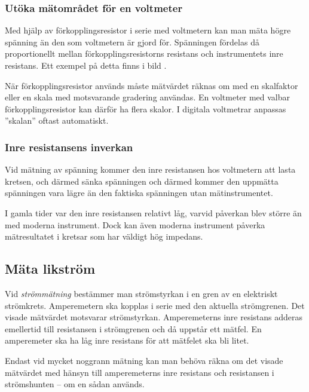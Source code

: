 \subsubsection{Utöka mätområdet för en voltmeter}

Med hjälp av förkopplingsresistor i serie med voltmetern kan man mäta
högre spänning än den som voltmetern är gjord för.
Spänningen fördelas då proportionellt mellan förkopplingsresistorns resistans
och instrumentets inre resistans.
Ett exempel på detta finns i bild .

När förkopplingsresistor används måste mätvärdet räknas om med en
skalfaktor eller en skala med motsvarande gradering användas.
En voltmeter med valbar förkopplingsresistor kan därför ha flera skalor.
I digitala voltmetrar anpassas ''skalan'' oftast automatiskt.

\newpage %
\subsubsection{Inre resistansens inverkan}

Vid mätning av spänning kommer den inre resistansen hos voltmetern att lasta
kretsen, och därmed sänka spänningen och därmed kommer den uppmätta spänningen
vara lägre än den faktiska spänningen utan mätinstrumentet.

I gamla tider var den inre resistansen relativt låg, varvid påverkan blev större
än med moderna instrument.
Dock kan även moderna instrument påverka mätresultatet i kretsar som har väldigt
hög impedans.

\subsection{Mäta likström}

Vid \emph{strömmätning} bestämmer man strömstyrkan i en gren av en elektriskt
strömkrets.
Amperemetern ska kopplas i serie med den aktuella strömgrenen.
Det visade mätvärdet motsvarar strömstyrkan.
Amperemeterns inre resistans adderas emellertid till resistansen i strömgrenen
och då uppstår ett mätfel.
En amperemeter ska ha låg inre resistans för att mätfelet ska bli litet.

Endast vid mycket noggrann mätning kan man behöva räkna om det visade
mätvärdet med hänsyn till amperemeterns inre resistans och resistansen
i strömshunten -- om en sådan används.

